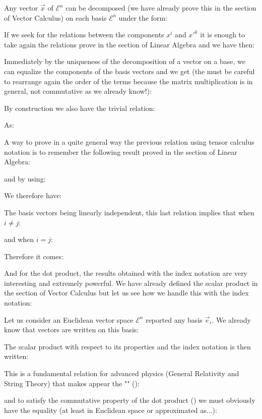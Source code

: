 	Any vector $\vec{x}$ of $\mathcal{E}^n$ can be decomposed (we have already prove this in the section of Vector Calculus) on each basis $\mathcal{E}^n$ under the form:
	
	If we seek for the relations between the components $x^i$ and ${x'}^k$ it is enough to take again the relations prove in the section of Linear Algebra and we have then:
	
	Immediately by the uniqueness of the decomposition of a vector on a base, we can equalize the components of the basis vectors and we get (the must be careful to rearrange again the order of the terms because the matrix multiplication is in general, not commutative as we already know!):
	
	By construction we also have the trivial relation:
	
	As:
	
	A way to prove in a quite general way the previous relation using tensor calculus notation is to remember the following result proved in the section of Linear Algebra:
	
	and by using:
	
	We therefore have:
	
	The basis vectors being linearly independent, this last relation implies that when $i\neq j$:
	
	and when $i=j$:
	
	Therefore it comes:
	
	And for the dot product, the results obtained with the index notation are very interesting and extremely powerful. We have already defined the scalar product in the section of Vector Calculus but let us see how we handle this with the index notation:

	Let us consider an Euclidean vector space $\mathcal{E}^n$ reported any basis ${\vec{e}_i}$. We already know that vectors are written on this basis:
	
	\label{metric tensor euclidean space}The scalar product with respect to its properties and the index notation is then written:
	
	This is a fundamental relation for advanced physics (General Relativity and String Theory) that makes appear the "" ():
	
	and to satisfy the commutative property of the dot product () we must obviously have the equality (at least in Euclidean space or approximated as...):
	
